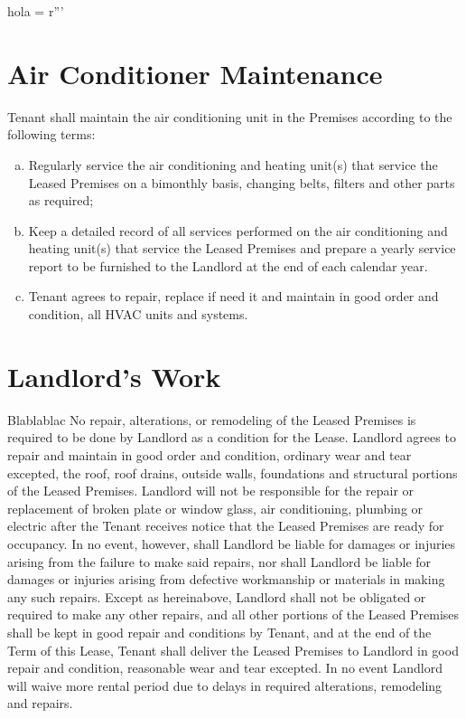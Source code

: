 hola = r'''\documentclass{article}
\newcommand{\landlordwork}{Blablablac}
\begin{document}
\section{Air Conditioner Maintenance}
    Tenant shall maintain the air conditioning unit in the Premises according to the following terms: 
    \begin{enumerate}[(a)]
    \item Regularly service the air conditioning and heating unit(s) that service the Leased Premises on a bimonthly basis, changing belts, filters and other parts as required;

	
    \item Keep a detailed record of all services performed on the air conditioning and heating unit(s) that service the Leased Premises and prepare a yearly service report to be furnished to the Landlord at the end of each calendar year.

    \item Tenant agrees to repair, replace if need it and maintain in good order and condition, all HVAC units and systems.

    \end{enumerate}

\section{Landlord's Work}
    \landlordwork{} No repair, alterations, or remodeling of the Leased Premises is required to be done by Landlord as a condition for the Lease.
    Landlord agrees to repair and maintain in good order and condition, ordinary wear and tear excepted, the roof, roof drains, outside walls, foundations and structural portions of the Leased Premises.  Landlord will not be responsible for the repair or replacement of broken plate or window glass, air conditioning, plumbing or electric after the Tenant receives notice that the Leased Premises are ready for occupancy.
    In no event, however, shall Landlord be liable for damages or injuries arising from the failure to make said repairs, nor shall Landlord be liable for damages or injuries arising from defective workmanship or materials in making any such repairs.  Except as hereinabove, Landlord shall not be obligated or required to make any other repairs, and all other portions of the Leased Premises shall be kept in good repair and conditions by Tenant, and at the end of the Term of this Lease, Tenant shall deliver the Leased Premises to Landlord in good repair and condition, reasonable wear and tear excepted.
    In no event Landlord will waive more rental period due to delays in required alterations, remodeling and repairs.
\end{document}
